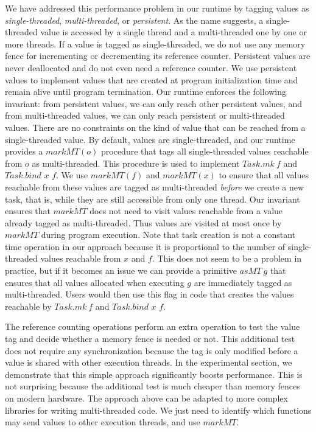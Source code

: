 We have addressed this performance problem in our runtime by tagging
values as \emph{single-threaded}, \emph{multi-threaded}, or
\emph{persistent}. As the name suggests, a single-threaded value is
accessed by a single thread and a multi-threaded one by one or more
threads. If a value is tagged as single-threaded, we do not use any
memory fence for incrementing or decrementing its reference counter.
Persistent values are never deallocated and do not even need a
reference counter.  We use persistent values to implement values
that are created at program initialization time and remain alive
until program termination.  Our runtime enforces the following
invariant: from persistent values, we can only reach other persistent
values, and from multi-threaded values, we can only reach persistent
or multi-threaded values. There are no constraints on the kind of
value that can be reached from a single-threaded value. By default,
values are single-threaded, and our runtime provides a
$\textit{markMT}(o)$ procedure that tags all single-threaded values
reachable from $o$ as multi-threaded.  This procedure is used to
implement $\textit{Task.mk}\ f$ and $\textit{Task.bind x f}$.  We use
$\textit{markMT}(f)$ and $\textit{markMT}(x)$ to ensure that all
values reachable from these values are tagged as multi-threaded \emph{before} we
create a new task, that is, while they are still accessible from only one thread.
Our invariant ensures that $\textit{markMT}$ does
not need to visit values reachable from a value already tagged
as multi-threaded.  Thus values are visited at most once by
$\textit{markMT}$ during program execution. Note that task creation is not
a constant time operation in our approach because it is proportional to the number of
single-threaded values reachable from $x$ and $f$. This does not seem
to be a problem in practice, but if it becomes an issue we can provide a
primitive $\textit{asMT}\ g$ that ensures that all values allocated
when executing $g$ are immediately tagged as multi-threaded.
Users would then use this flag in code that creates the values reachable by
$\textit{Task.mk}\ f$ and $\textit{Task.bind x f}$.

The reference counting operations perform an extra operation to test
the value tag and decide whether a memory fence is needed or not.
This additional test does not require any synchronization because the
tag is only modified before a value is shared with other execution
threads. In the experimental section, we demonstrate that this simple
approach significantly boosts performance. This is not surprising
because the additional test is much cheaper than memory fences on
modern hardware.
The approach above can be adapted to more complex libraries for
writing multi-threaded code. We just need to identify which functions
may send values to other execution threads, and use $\textit{markMT}$.

